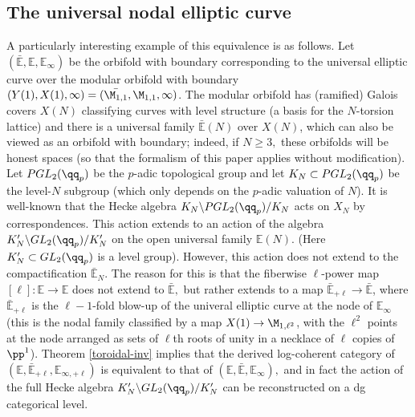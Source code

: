 \documentclass{article}
\newcommand{\ee}{\mathbb{E}}
\begin{document}
\subsection{The universal nodal elliptic curve}
A particularly interesting example of this equivalence is as follows. Let $(\bar{\ee}, \ee, \ee_\infty)$ be the orbifold with boundary corresponding to the universal elliptic curve over the modular orbifold with boundary $(Y(1), X(1), \infty) = (\bar{\M_{1, 1}}, \M_{1, 1}, \infty)$. The modular orbifold has (ramified) Galois covers $X(N)$ classifying curves with level structure (a basis for the $N$-torsion lattice) and there is a universal family $\bar{\ee}(N)$ over $X(N)$, which can also be viewed as an orbifold with boundary; indeed, if $N\ge 3,$ these orbifolds will be honest spaces (so that the formalism of this paper applies without modification). Let $PGL_2(\qq_p)$ be the $p$-adic topological group and let $K_N\subset PGL_2(\qq_p)$ be the level-$N$ subgroup (which only depends on the $p$-adic valuation of $N$). It is well-known that the Hecke algebra $K_N\backslash PGL_2(\qq_p)/K_N$ acts on $X_N$ by correspondences. This action extends to an action of the algebra $K_N'\backslash GL_2(\qq_p)/K_N'$ on the open universal family $\ee(N)$. (Here $K_N'\subset GL_2(\qq_p)$ is a level group). However, this action does not extend to the compactification $\bar{\ee}_N$. The reason for this is that the fiberwise $\ell$-power map $[\ell]: \ee\to \ee$ does not extend to $\bar{\ee},$ but rather extends to a map $\bar{\ee}_{+\ell}\to \bar{\ee}$, where $\bar{\ee}_{+\ell}$ is the $\ell-1$-fold blow-up of the univeral elliptic curve at the node of $\ee_\infty$ (this is the nodal family classified by a map $X(1)\to \M_{1, \ell^2}$, with the $\ell^2$ points at the node arranged as sets of $\ell$th roots of unity in a necklace of $\ell$ copies of $\pp^1$). Theorem \ref{toroidal-inv} implies that the derived log-coherent category of $(\ee, \bar{\ee}_{+\ell}, \ee_{\infty, +\ell})$ is equivalent to that of $(\ee, \bar{\ee}, \ee_\infty),$ and in fact the action of the full Hecke algebra $K_N'\backslash GL_2(\qq_p)/K_N'$ can be reconstructed on a dg categorical level.
\end{document}
